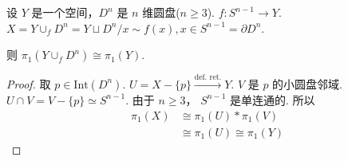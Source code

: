 \begin{instance}
    设 $Y$ 是一个空间，$D^n$ 是 $n$ 维圆盘($n \geq 3$).
    $f: S^{n-1} \to Y$.
    $X = Y \cup_f D^n = Y \sqcup D^n / x \sim f(x), x \in S^{n-1} = \partial D^n$.
    
    则 $\pi_1(Y \cup_f D^n) \cong \pi_1(Y)$.
\end{instance}

\begin{proof}
    取 $p \in \text{Int}(D^n)$.
    $U = X - \{p\} \xrightarrow{\text{def. ret.}} Y$.
    $V$ 是 $p$ 的小圆盘邻域.
    $U \cap V = V - \{p\} \simeq S^{n-1}$.
    由于 $n \geq 3$， $S^{n-1}$ 是单连通的.
    所以
    \[
    \begin{aligned}
    \pi_1(X) &\cong \pi_1(U) * \pi_1(V) \\
    &\cong \pi_1(U) \cong \pi_1(Y)
    \end{aligned}
    \]
\end{proof}






